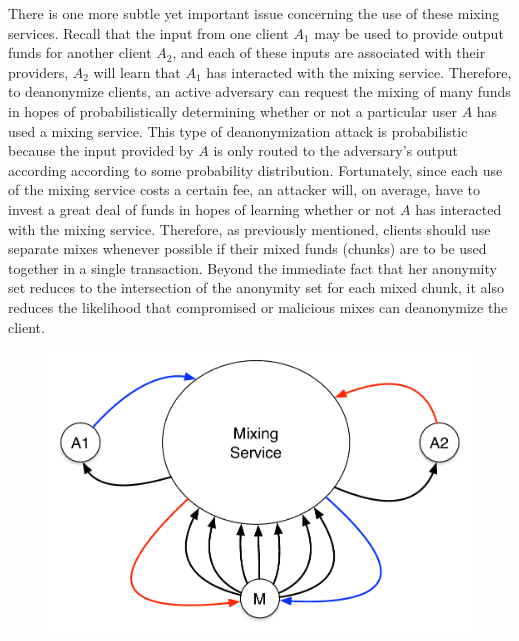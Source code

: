 There is one more subtle yet important issue concerning the use of these mixing services. Recall that the input from one client $A_1$ may be used to provide output funds for another client $A_2$, and each of these inputs are associated with their providers, $A_2$ will learn that $A_1$ has interacted with the mixing service. Therefore, to deanonymize clients, an active adversary can request the mixing of many funds in hopes of probabilistically determining whether or not a particular user $A$ has used a mixing service. This type of deanonymization attack is probabilistic because the input provided by $A$ is only routed to the adversary's output according according to some probability distribution. Fortunately, since each use of the mixing service costs a certain fee, an attacker will, on average, have to invest a great deal of funds in hopes of learning whether or not $A$ has interacted with the mixing service. Therefore, as previously mentioned, clients should use separate mixes whenever possible if their mixed funds (chunks) are to be used together in a single transaction. Beyond the immediate fact that her anonymity set reduces to the intersection of the anonymity set for each mixed chunk, it also reduces the likelihood that compromised or malicious mixes can deanonymize the client. 

\begin{figure}
\begin{center}
\includegraphics[scale=0.45]{images/mixcoin_deanon.pdf}
\label{TODO.}
\label{fig:mix-design}
\end{center}
\end{figure}

